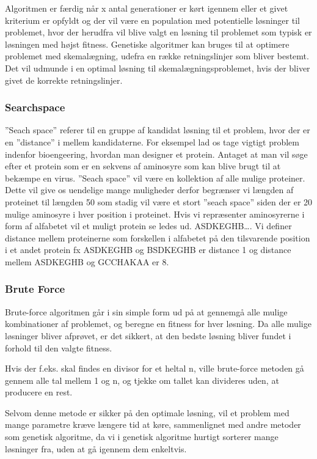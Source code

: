 Algoritmen er færdig når x antal generationer er kørt igennem eller et givet kriterium er opfyldt og der vil være en population med potentielle løsninger til problemet, hvor der herudfra vil blive valgt en løsning til problemet som typisk er løsningen med højst fitness. Genetiske algoritmer kan bruges til at optimere problemet med skemalægning, udefra en række retningslinjer som bliver bestemt. Det vil udmunde i en optimal løsning til skemalægningsproblemet, hvis der bliver givet de korrekte retningslinjer.

\subsubsection{Searchspace}
”Seach space” referer til en gruppe af kandidat løsning til et problem, hvor der er en ”distance” i mellem kandidaterne. For eksempel lad os tage vigtigt problem indenfor bioengeering, hvordan man designer et protein. Antaget at man vil søge efter et protein som er en sekvens af aminosyre som kan blive brugt til at bekæmpe en virus. ”Seach space” vil være en kollektion af alle mulige proteiner. Dette vil give os uendelige mange muligheder derfor begrænser vi længden af proteinet til længden 50 som stadig vil være et stort ”seach space” siden der er 20 mulige aminosyre i hver position i proteinet. Hvis vi repræsenter aminosyrerne i form af alfabetet vil et muligt protein se ledes ud. 
ASDKEGHB…. Vi definer distance mellem proteinerne som forskellen i alfabetet på den tilsvarende position i et andet protein fx ASDKEGHB og BSDKEGHB er distance 1 og distance mellem ASDKEGHB og GCCHAKAA er 8.


\subsubsection{Brute Force}

Brute-force algoritmen går i sin simple form ud på at gennemgå alle mulige kombinationer af problemet, og beregne en fitness for hver løsning. Da alle mulige løsninger bliver afprøvet, er det sikkert, at den bedste løsning bliver fundet i forhold til den valgte fitness. 

Hvis der f.eks. skal findes en divisor for et heltal n, ville brute-force metoden gå gennem alle tal mellem 1 og n, og tjekke om tallet kan divideres uden, at producere en rest.

Selvom denne metode er sikker på den optimale løsning, vil et problem med mange parametre kræve længere tid at køre, sammenlignet med andre metoder som genetisk algoritme, da vi i genetisk algoritme hurtigt sorterer mange løsninger fra, uden at gå igennem dem enkeltvis.

